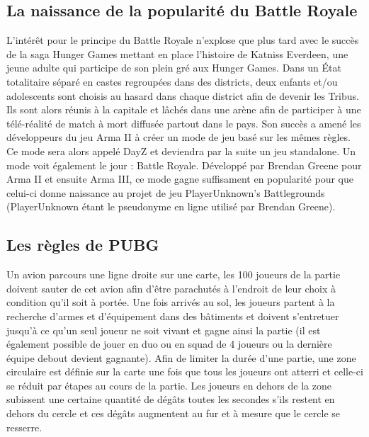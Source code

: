 \subsection{La naissance de la popularité du Battle Royale}
L'intérêt pour le principe du Battle Royale n'explose que plus tard avec le succès de la saga Hunger Games mettant en place l'histoire de Katniss Everdeen, une jeune adulte qui participe de son plein gré aux Hunger Games. Dans un État totalitaire séparé en castes regroupées dans des districts, deux enfants et/ou adolescents sont choisis au hasard dans chaque district afin de devenir les Tribus. Ils sont alors réunis à la capitale et lâchés dans une arène afin de participer à une télé-réalité de match à mort diffusée partout dans le pays.
Son succès a amené les développeurs du jeu Arma II à créer un mode de jeu basé sur les mêmes règles. Ce mode sera alors appelé DayZ et deviendra par la suite un jeu standalone. Un mode voit également le jour : Battle Royale. Développé par Brendan Greene pour Arma II et ensuite Arma III, ce mode gagne suffisament en popularité pour que celui-ci donne naissance au projet de jeu PlayerUnknown's Battlegrounds (PlayerUnknown étant le pseudonyme en ligne utilisé par Brendan Greene).

\subsection{Les règles de PUBG}
Un avion parcours une ligne droite sur une carte, les 100 joueurs de la partie doivent sauter de cet avion afin d'être parachutés à l'endroit de leur choix à condition qu'il soit à portée. Une fois arrivés au sol, les joueurs partent à la recherche d'armes et d'équipement dans des bâtiments et doivent s'entretuer jusqu'à ce qu'un seul joueur ne soit vivant et gagne ainsi la partie (il est également possible de jouer en duo ou en squad de 4 joueurs ou la dernière équipe debout devient gagnante). Afin de limiter la durée d'une partie, une zone circulaire est définie sur la carte une fois que tous les joueurs ont atterri et celle-ci se réduit par étapes au cours de la partie. Les joueurs en dehors de la zone subissent une certaine quantité de dégâts toutes les secondes s'ils restent en dehors du cercle et ces dégâts augmentent au fur et à mesure que le cercle se resserre.

